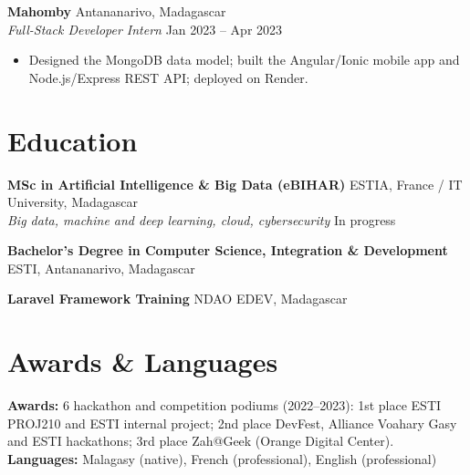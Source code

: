 \documentclass[10pt,a4paper]{article}
\newcommand{\role}[4]{%
  \vspace{3pt}%
  \textbf{#1} \hfill #2\\[-0.1em]
  \textit{#3} \hfill #4\par\vspace{1pt}}
\begin{document}
\role{Mahomby}{Antananarivo, Madagascar}{Full-Stack Developer Intern}{Jan 2023 -- Apr 2023}
\begin{itemize}
  \item Designed the MongoDB data model; built the Angular/Ionic mobile app and Node.js/Express REST API; deployed on Render.
\end{itemize}

\section*{Education}
\role{MSc in Artificial Intelligence \& Big Data (eBIHAR)}{ESTIA, France / IT University, Madagascar}{Big data, machine and deep learning, cloud, cybersecurity}{In progress}
\vspace{3pt}\textbf{Bachelor's Degree in Computer Science, Integration \& Development} \hfill ESTI, Antananarivo, Madagascar\par
\vspace{1pt}\textbf{Laravel Framework Training} \hfill NDAO EDEV, Madagascar\par

\section*{Awards \& Languages}
\textbf{Awards:} 6 hackathon and competition podiums (2022--2023): 1st place ESTI PROJ210 and ESTI internal project; 2nd place DevFest, Alliance Voahary Gasy and ESTI hackathons; 3rd place Zah@Geek (Orange Digital Center).\\
\textbf{Languages:} Malagasy (native), French (professional), English (professional)
\end{document}
